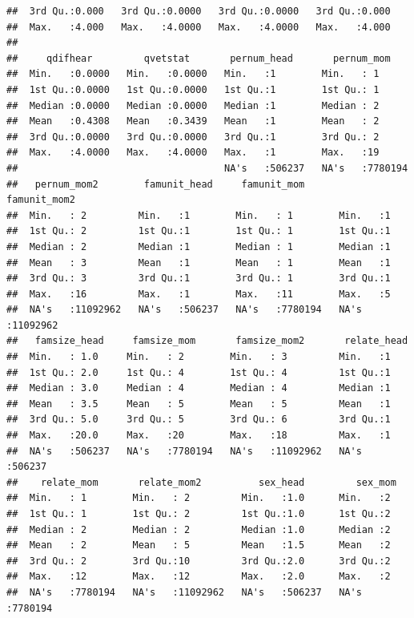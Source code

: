 \documentclass[
]{article}
\begin{document}
\begin{verbatim}
##  3rd Qu.:0.000   3rd Qu.:0.0000   3rd Qu.:0.0000   3rd Qu.:0.000  
##  Max.   :4.000   Max.   :4.0000   Max.   :4.0000   Max.   :4.000  
##                                                                   
##     qdifhear         qvetstat       pernum_head       pernum_mom     
##  Min.   :0.0000   Min.   :0.0000   Min.   :1        Min.   : 1       
##  1st Qu.:0.0000   1st Qu.:0.0000   1st Qu.:1        1st Qu.: 1       
##  Median :0.0000   Median :0.0000   Median :1        Median : 2       
##  Mean   :0.4308   Mean   :0.3439   Mean   :1        Mean   : 2       
##  3rd Qu.:0.0000   3rd Qu.:0.0000   3rd Qu.:1        3rd Qu.: 2       
##  Max.   :4.0000   Max.   :4.0000   Max.   :1        Max.   :19       
##                                    NA's   :506237   NA's   :7780194  
##   pernum_mom2        famunit_head     famunit_mom       famunit_mom2     
##  Min.   : 2         Min.   :1        Min.   : 1        Min.   :1         
##  1st Qu.: 2         1st Qu.:1        1st Qu.: 1        1st Qu.:1         
##  Median : 2         Median :1        Median : 1        Median :1         
##  Mean   : 3         Mean   :1        Mean   : 1        Mean   :1         
##  3rd Qu.: 3         3rd Qu.:1        3rd Qu.: 1        3rd Qu.:1         
##  Max.   :16         Max.   :1        Max.   :11        Max.   :5         
##  NA's   :11092962   NA's   :506237   NA's   :7780194   NA's   :11092962  
##   famsize_head     famsize_mom       famsize_mom2       relate_head    
##  Min.   : 1.0     Min.   : 2        Min.   : 3         Min.   :1       
##  1st Qu.: 2.0     1st Qu.: 4        1st Qu.: 4         1st Qu.:1       
##  Median : 3.0     Median : 4        Median : 4         Median :1       
##  Mean   : 3.5     Mean   : 5        Mean   : 5         Mean   :1       
##  3rd Qu.: 5.0     3rd Qu.: 5        3rd Qu.: 6         3rd Qu.:1       
##  Max.   :20.0     Max.   :20        Max.   :18         Max.   :1       
##  NA's   :506237   NA's   :7780194   NA's   :11092962   NA's   :506237  
##    relate_mom       relate_mom2          sex_head         sex_mom       
##  Min.   : 1        Min.   : 2         Min.   :1.0      Min.   :2        
##  1st Qu.: 1        1st Qu.: 2         1st Qu.:1.0      1st Qu.:2        
##  Median : 2        Median : 2         Median :1.0      Median :2        
##  Mean   : 2        Mean   : 5         Mean   :1.5      Mean   :2        
##  3rd Qu.: 2        3rd Qu.:10         3rd Qu.:2.0      3rd Qu.:2        
##  Max.   :12        Max.   :12         Max.   :2.0      Max.   :2        
##  NA's   :7780194   NA's   :11092962   NA's   :506237   NA's   :7780194  

\end{verbatim}
\end{document}
